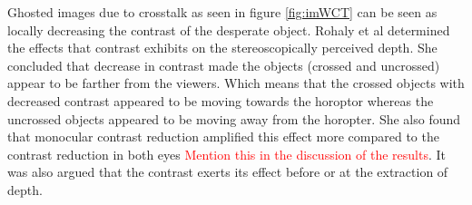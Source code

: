 Ghosted images due to crosstalk as seen in figure \ref{fig:imWCT} can be seen as locally decreasing the contrast of the desperate object. Rohaly et al \cite{rohaly1999effects} determined the effects that contrast exhibits on the stereoscopically perceived depth. She concluded that decrease in contrast made the objects (crossed and uncrossed) appear to be farther from the viewers. Which means that the crossed objects with decreased contrast appeared to be moving towards the horoptor whereas the uncrossed objects appeared to be moving away from the horopter. She also found that monocular contrast reduction amplified this effect more compared to the contrast reduction in both eyes \textcolor{red}{Mention this in the discussion of the results}. It was also argued that the contrast exerts its effect before or at the extraction of depth.

